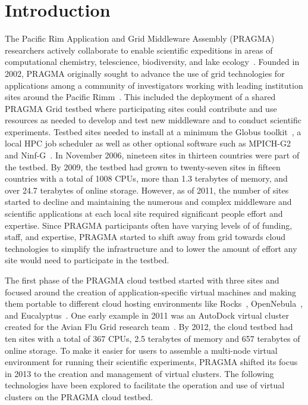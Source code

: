 \documentclass{acm_proc_article-sp}
\begin{document}



\section{Introduction}
\label{Sec:intro}

The Pacific Rim Application and Grid Middleware Assembly (PRAGMA) researchers actively collaborate to enable scientific expeditions in areas of computational chemistry, telescience, biodiversity, and lake ecology~\cite{pragmaWeb}.  Founded in 2002, PRAGMA originally sought to advance the use of grid technologies for applications among a community of investigators working with leading institution sites around the Pacific Rimm~\cite{pragmaReport2004}.  This included the deployment of a shared PRAGMA Grid testbed where participating sites could contribute and use resources as needed to develop and test new middleware and to conduct scientific experiments.  Testbed sites needed to install at a minimum the Globus toolkit~\cite{globus}, a local HPC job scheduler as well as other optional software such as MPICH-G2~\cite{mpichg2} and Ninf-G~\cite{ninfg}.  In November 2006, nineteen sites in thirteen countries were part of the testbed.  By 2009, the testbed had grown to twenty-seven sites in fifteen countries with a total of 1008 CPUs, more than 1.3 terabytes of memory, and over 24.7 terabytes of online storage.  However, as of 2011, the number of sites started to decline and maintaining the numerous and complex middleware and scientific applications at each local site required significant people effort and expertise.  Since PRAGMA participants often have varying levels of of funding, staff, and expertise, PRAGMA started to shift away from grid towards cloud technologies to simplify the infrastructure and to lower the amount of effort any site would need to participate in the testbed.  

The first phase of the PRAGMA cloud testbed started with three sites and focused around the creation of application-specific virtual machines and making them portable to  different cloud hosting environments like Rocks~\cite{rocks}, OpenNebula~\cite{opennebula}, and Eucalyptus~\cite{eucalyptus}.
One early example in 2011 was an AutoDock virtual cluster created for the Avian Flu Grid research team~\cite{pragmaReport2011}.   By 2012, the cloud testbed had ten sites with a total of 367 CPUs, 2.5 terabytes of memory and 657 terabytes of online storage.  To make it easier for users to assemble a multi-node virtual environment for running their scientific experiments, PRAGMA shifted its  focus in 2013 to the creation and management of virtual clusters.  The following technologies have been explored to facilitate the operation and use of virtual clusters on the PRAGMA cloud testbed.
\end{document}
